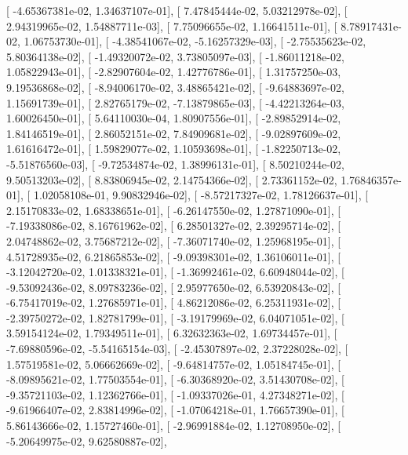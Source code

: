 \documentclass{article}
\begin{document}
       [ -4.65367381e-02,   1.34637107e-01],
       [  7.47845444e-02,   5.03212978e-02],
       [  2.94319965e-02,   1.54887711e-03],
       [  7.75096655e-02,   1.16641511e-01],
       [  8.78917431e-02,   1.06753730e-01],
       [ -4.38541067e-02,  -5.16257329e-03],
       [ -2.75535623e-02,   5.80364138e-02],
       [ -1.49320072e-02,   3.73805097e-03],
       [ -1.86011218e-02,   1.05822943e-01],
       [ -2.82907604e-02,   1.42776786e-01],
       [  1.31757250e-03,   9.19536868e-02],
       [ -8.94006170e-02,   3.48865421e-02],
       [ -9.64883697e-02,   1.15691739e-01],
       [  2.82765179e-02,  -7.13879865e-03],
       [ -4.42213264e-03,   1.60026450e-01],
       [  5.64110030e-04,   1.80907556e-01],
       [ -2.89852914e-02,   1.84146519e-01],
       [  2.86052151e-02,   7.84909681e-02],
       [ -9.02897609e-02,   1.61616472e-01],
       [  1.59829077e-02,   1.10593698e-01],
       [ -1.82250713e-02,  -5.51876560e-03],
       [ -9.72534874e-02,   1.38996131e-01],
       [  8.50210244e-02,   9.50513203e-02],
       [  8.83806945e-02,   2.14754366e-02],
       [  2.73361152e-02,   1.76846357e-01],
       [  1.02058108e-01,   9.90832946e-02],
       [ -8.57217327e-02,   1.78126637e-01],
       [  2.15170833e-02,   1.68338651e-01],
       [ -6.26147550e-02,   1.27871090e-01],
       [ -7.19338086e-02,   8.16761962e-02],
       [  6.28501327e-02,   2.39295714e-02],
       [  2.04748862e-02,   3.75687212e-02],
       [ -7.36071740e-02,   1.25968195e-01],
       [  4.51728935e-02,   6.21865853e-02],
       [ -9.09398301e-02,   1.36106011e-01],
       [ -3.12042720e-02,   1.01338321e-01],
       [ -1.36992461e-02,   6.60948044e-02],
       [ -9.53092436e-02,   8.09783236e-02],
       [  2.95977650e-02,   6.53920843e-02],
       [ -6.75417019e-02,   1.27685971e-01],
       [  4.86212086e-02,   6.25311931e-02],
       [ -2.39750272e-02,   1.82781799e-01],
       [ -3.19179969e-02,   6.04071051e-02],
       [  3.59154124e-02,   1.79349511e-01],
       [  6.32632363e-02,   1.69734457e-01],
       [ -7.69880596e-02,  -5.54165154e-03],
       [ -2.45307897e-02,   2.37228028e-02],
       [  1.57519581e-02,   5.06662669e-02],
       [ -9.64814757e-02,   1.05184745e-01],
       [ -8.09895621e-02,   1.77503554e-01],
       [ -6.30368920e-02,   3.51430708e-02],
       [ -9.35721103e-02,   1.12362766e-01],
       [ -1.09337026e-01,   4.27348271e-02],
       [ -9.61966407e-02,   2.83814996e-02],
       [ -1.07064218e-01,   1.76657390e-01],
       [  5.86143666e-02,   1.15727460e-01],
       [ -2.96991884e-02,   1.12708950e-02],
       [ -5.20649975e-02,   9.62580887e-02],
\end{document}
